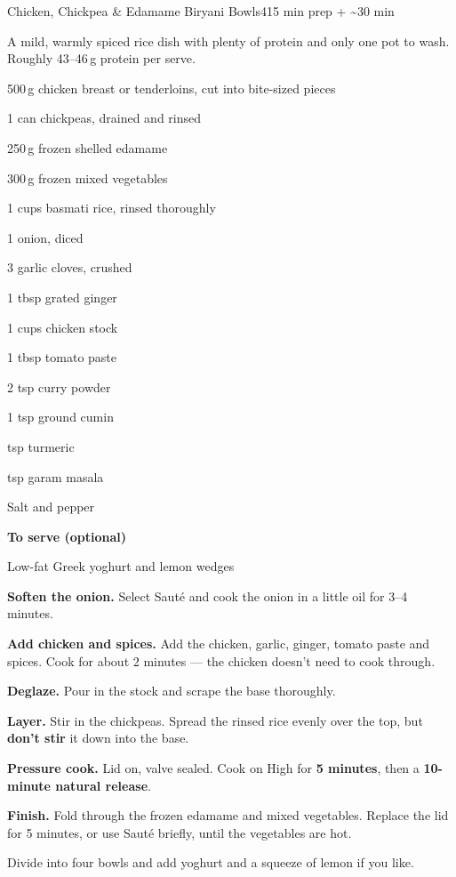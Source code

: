 \begin{recipebox}{Chicken, Chickpea \& Edamame Biryani Bowls}{4}{15 min prep + \textasciitilde30 min}

A mild, warmly spiced rice dish with plenty of protein and only one pot to
wash. Roughly 43--46\,g protein per serve.

\begin{ingredients}
  \item 500\,g chicken breast or tenderloins, cut into bite-sized pieces
  \item 1 can chickpeas, drained and rinsed
  \item 250\,g frozen shelled edamame
  \item 300\,g frozen mixed vegetables
  \item 1 cups basmati rice, rinsed thoroughly
  \item 1 onion, diced
  \item 3 garlic cloves, crushed
  \item 1 tbsp grated ginger
  \item 1 cups chicken stock
  \item 1 tbsp tomato paste
  \item 2 tsp curry powder
  \item 1 tsp ground cumin
  \item {} tsp turmeric
  \item {} tsp garam masala
  \item Salt and pepper
  \item[] \textbf{To serve (optional)}
  \item Low-fat Greek yoghurt and lemon wedges
\end{ingredients}

\begin{method}
  \item \textbf{Soften the onion.} Select Saut\'e and cook the onion in a little oil for 3--4 minutes.
  \item \textbf{Add chicken and spices.} Add the chicken, garlic, ginger, tomato paste and spices. Cook for about 2 minutes --- the chicken doesn't need to cook through.
  \item \textbf{Deglaze.} Pour in the stock and scrape the base thoroughly.
  \item \textbf{Layer.} Stir in the chickpeas. Spread the rinsed rice evenly over the top, but \textbf{don't stir} it down into the base.
  \item \textbf{Pressure cook.} Lid on, valve sealed. Cook on High for \textbf{5 minutes}, then a \textbf{10-minute natural release}.
  \item \textbf{Finish.} Fold through the frozen edamame and mixed vegetables. Replace the lid for 5 minutes, or use Saut\'e briefly, until the vegetables are hot.
  \item Divide into four bowls and add yoghurt and a squeeze of lemon if you like.
\end{method}


\end{recipebox}
